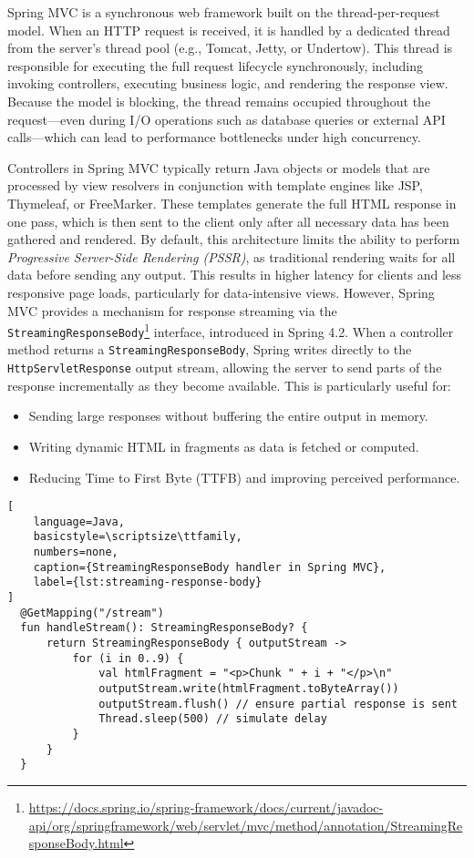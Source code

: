 Spring MVC is a synchronous web framework built on the
thread-per-request model. When an HTTP request is received, it is handled by a
dedicated thread from the server’s thread pool (e.g., Tomcat, Jetty, or
Undertow). This thread is responsible for executing the full request lifecycle
synchronously, including invoking controllers, executing business logic, and
rendering the response view. Because the model is blocking, the thread remains
occupied throughout the request—even during I/O operations such as database
queries or external API calls—which can lead to performance bottlenecks under
high concurrency.

Controllers in Spring MVC typically return Java objects or models that are
processed by view resolvers in conjunction with template engines like JSP,
Thymeleaf, or FreeMarker. These templates generate the full HTML response in
one pass, which is then sent to the client only after all necessary data has
been gathered and rendered. By default, this architecture limits the ability to
perform \textit{Progressive Server-Side Rendering (PSSR)}, as traditional
rendering waits for all data before sending any output. This results in higher
latency for clients and less responsive page loads, particularly for
data-intensive views. However, Spring MVC provides a mechanism for response
streaming via the \texttt{StreamingResponseBody}\footnote{\url{https://docs.spring.io/spring-framework/docs/current/javadoc-api/org/springframework/web/servlet/mvc/method/annotation/StreamingResponseBody.html}} interface, introduced in
Spring 4.2. When a controller method returns a \texttt{StreamingResponseBody},
Spring writes directly to the \texttt{HttpServletResponse} output stream,
allowing the server to send parts of the response incrementally as they become
available. This is particularly useful for:
\begin{itemize}
  \item Sending large responses without buffering the entire output in memory.
  \item Writing dynamic HTML in fragments as data is fetched or computed.
  \item Reducing Time to First Byte (TTFB) and improving perceived performance.
\end{itemize}

\begin{lstlisting}[
    language=Java,
    basicstyle=\scriptsize\ttfamily,
    numbers=none,
    caption={StreamingResponseBody handler in Spring MVC},
    label={lst:streaming-response-body}
]
  @GetMapping("/stream")
  fun handleStream(): StreamingResponseBody? {
      return StreamingResponseBody { outputStream ->
          for (i in 0..9) {
              val htmlFragment = "<p>Chunk " + i + "</p>\n"
              outputStream.write(htmlFragment.toByteArray())
              outputStream.flush() // ensure partial response is sent
              Thread.sleep(500) // simulate delay
          }
      }
  }
\end{lstlisting}

